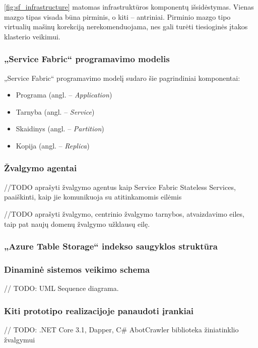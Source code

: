 

\ref{fig:sf_infrastructure} matomas infrastruktūros komponentų išsidėstymas. Vienas mazgo tipas visada būna pirminis, o kiti -- antriniai. Pirminio mazgo tipo virtualių mašinų korekciją nerekomenduojama, nes gali turėti tiesioginės įtakos klasterio veikimui.

\subsubsection{„Service Fabric“ programavimo modelis}

„Service Fabric“ programavimo modelį sudaro šie pagrindiniai komponentai:

\begin{itemize}
    \item Programa (angl. -- \textit{Application})
    \item Tarnyba (angl. -- \textit{Service})
    \item Skaidinys (angl. -- \textit{Partition})
    \item Kopija (angl. -- \textit{Replica})
\end{itemize}



\subsubsection{Žvalgymo agentai}

//TODO aprašyti žvalgymo agentus kaip Service Fabric Stateless Services, paaiškinti, kaip jie komunikuoja su atitinkamomis eilėmis


//TODO aprašyti žvalgymo, centrinio žvalgymo tarnybos, atvaizdavimo eiles, taip pat naujų domenų žvalgymo užklausų eilę.

\subsubsection{„Azure Table Storage“ indekso saugyklos struktūra}


\subsubsection{Dinaminė sistemos veikimo schema}

// TODO: UML Sequence diagrama.

\subsubsection{Kiti prototipo realizacijoje panaudoti įrankiai}

// TODO: .NET Core 3.1, Dapper, C\# AbotCrawler biblioteka žiniatinklio žvalgymui